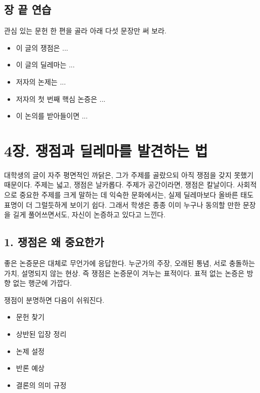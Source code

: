 \section{장 끝 연습}\label{uxc7a5-uxb05d-uxc5f0uxc2b5-1}

관심 있는 문헌 한 편을 골라 아래 다섯 문장만 써 보라.

\begin{itemize}
\tightlist
\item
  이 글의 쟁점은 ...
\item
  이 글의 딜레마는 ...
\item
  저자의 논제는 ...
\item
  저자의 첫 번째 핵심 논증은 ...
\item
  이 논의를 받아들이면 ...
\end{itemize}

\chapter{4장. 쟁점과 딜레마를 발견하는 법}\label{4uxc7a5-uxc7c1uxc810uxacfc-uxb51cuxb808uxb9c8uxb97c-uxbc1cuxacacuxd558uxb294-uxbc95}

대학생의 글이 자주 평면적인 까닭은, 그가 주제를 골랐으되 아직 쟁점을 갖지 못했기 때문이다. 주제는 넓고, 쟁점은 날카롭다. 주제가 공간이라면, 쟁점은 칼날이다. 사회적으로 중요한 주제를 크게 말하는 데 익숙한 문화에서는, 실제 딜레마보다 올바른 태도 표명이 더 그럴듯하게 보이기 쉽다. 그래서 학생은 종종 이미 누구나 동의할 만한 문장을 길게 풀어쓰면서도, 자신이 논증하고 있다고 느낀다.

\section{1. 쟁점은 왜 중요한가}\label{1-uxc7c1uxc810uxc740-uxc65c-uxc911uxc694uxd55cuxac00}

좋은 논증문은 대체로 무언가에 응답한다. 누군가의 주장, 오래된 통념, 서로 충돌하는 가치, 설명되지 않는 현상. 즉 쟁점은 논증문이 겨누는 표적이다. 표적 없는 논증은 방향 없는 행군에 가깝다.

쟁점이 분명하면 다음이 쉬워진다.

\begin{itemize}
\tightlist
\item
  문헌 찾기
\item
  상반된 입장 정리
\item
  논제 설정
\item
  반론 예상
\item
  결론의 의미 규정
\end{itemize}

